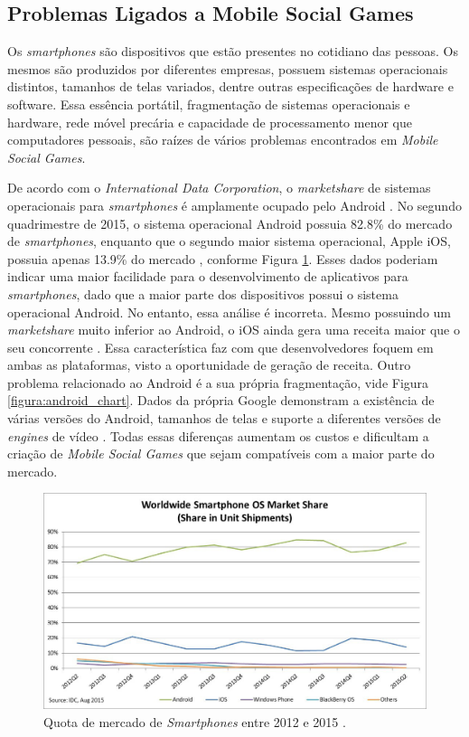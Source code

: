   \subsection{Problemas Ligados a Mobile Social Games}

Os \textit{smartphones} são dispositivos que estão presentes no cotidiano das pessoas. Os mesmos são produzidos por diferentes empresas, possuem sistemas operacionais distintos, tamanhos de telas variados, dentre outras especificações de hardware e software. Essa essência portátil, fragmentação de sistemas operacionais e hardware, rede móvel precária e capacidade de processamento menor que computadores pessoais, são raízes de vários problemas encontrados em \textit{Mobile Social Games}.

De acordo com o \textit{International Data Corporation}, o \textit{marketshare} de sistemas operacionais para \textit{smartphones} é amplamente ocupado pelo Android \cite{idc}. No segundo quadrimestre de 2015, o sistema operacional Android possuia 82.8\% do mercado de \textit{smartphones}, enquanto que o segundo maior sistema operacional, Apple iOS, possuia apenas 13.9\% do mercado \cite{idc}, conforme Figura \ref{figura:market_share}. Esses dados poderiam indicar uma maior facilidade para o desenvolvimento de aplicativos para \textit{smartphones}, dado que a maior parte dos dispositivos possui o sistema operacional Android. No entanto, essa análise é incorreta. Mesmo possuindo um \textit{marketshare} muito inferior ao Android, o iOS ainda gera uma receita maior que o seu concorrente \cite{appAnnie}. Essa característica faz com que desenvolvedores foquem em ambas as plataformas, visto a oportunidade de geração de receita. Outro problema relacionado ao Android é a sua própria fragmentação, vide Figura \ref{figura:android_chart}. Dados da própria Google demonstram a existência de várias versões do Android, tamanhos de telas e suporte a diferentes versões de \textit{engines} de vídeo \cite{dashboardGoogle}. Todas essas diferenças aumentam os custos e dificultam a criação de \textit{Mobile Social Games} que sejam compatíveis com a maior parte do mercado.

\begin{figure}[h]
  \centering
  \includegraphics[width=12cm]{figuras/market_share}
  \caption{Quota de mercado de \textit{Smartphones} entre 2012 e 2015 \cite{idc}.}
  \label{figura:market_share}
\end{figure}

